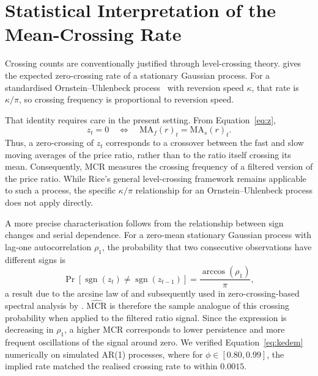 \documentclass[11pt,a4paper]{article}
\theoremstyle{definition}
\newcommand{\MCR}{\ensuremath{\mathrm{MCR}}}
\begin{document}
\section{Statistical Interpretation of the Mean-Crossing Rate}
\label{sec:theory}

Crossing counts are conventionally justified through level-crossing theory.
\citet{rice1944} gives the expected zero-crossing rate of a stationary Gaussian
process. For a standardised Ornstein--Uhlenbeck process~\citep{vasicek1977}
with reversion speed $\kappa$, that rate is $\kappa/\pi$, so crossing frequency
is proportional to reversion speed.

That identity requires care in the present setting. From
Equation~\eqref{eq:z},
\begin{equation}
  z_t = 0 \quad\Longleftrightarrow\quad \mathrm{MA}_f(r)_t = \mathrm{MA}_s(r)_t.
  \label{eq:crossmeaning}
\end{equation}
Thus, a zero-crossing of $z_t$ corresponds to a crossover between the fast and
slow moving averages of the price ratio, rather than to the ratio itself crossing
its mean. Consequently, MCR measures the crossing frequency of a filtered version
of the price ratio. While Rice's general level-crossing framework remains applicable
to such a process, the specific $\kappa/\pi$ relationship for an
Ornstein--Uhlenbeck process does not apply directly.

A more precise characterisation follows from the relationship between sign changes
and serial dependence. For a zero-mean stationary Gaussian process with lag-one
autocorrelation $\rho_1$, the probability that two consecutive observations have
different signs is
\begin{equation}
\Pr\!\left[\operatorname{sgn}(z_t)\neq\operatorname{sgn}(z_{t-1})\right]
=
\frac{\arccos(\rho_1)}{\pi},
\label{eq:kedem}
\end{equation}
a result due to the arcsine law of \citet{vanvleck1966} and subsequently used in
zero-crossing-based spectral analysis by \citet{kedem1986}. $\widehat{\MCR}$ is
therefore the sample analogue of this crossing probability when applied to the
filtered ratio signal. Since the expression is decreasing in $\rho_1$, a higher
MCR corresponds to lower persistence and more frequent oscillations of the signal
around zero. We verified
Equation~\eqref{eq:kedem} numerically on simulated AR(1) processes, where for
$\phi \in [0.80, 0.99]$, the implied rate matched the realised crossing rate to
within $0.0015$.
\end{document}
